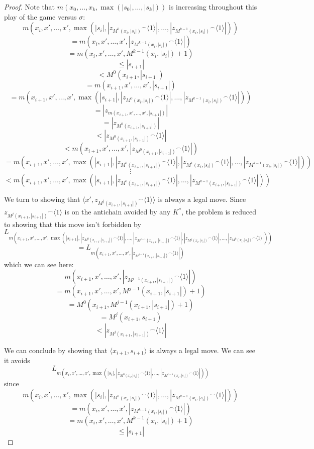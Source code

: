 \documentclass[11pt]{article}
\theoremstyle{plain}
\theoremstyle{definition}
\theoremstyle{remark}
\newcommand{\<}{\langle}
\renewcommand{\>}{\rangle}
\begin{document}
\begin{proof}
Note that $m(x_0,\dots,x_{k},\max(|s_0|,\dots,|s_k|))$ is increasing throughout this play of the game versus $\sigma$:
  \[
    m(x_i,x',\dots,x',\max(|s_i|,|{z_{M^0(x_i,|s_i|)}}^\frown\<1\>|,\dots,|{z_{M^{k-1}(x_i,|s_i|)}}^\frown\<1\>|))
  \]
  \[
    =
    m(x_i,x',\dots,x',|{z_{M^{k-1}(x_i,|s_i|)}}^\frown\<1\>|)
  \]
  \[
    =
    m(x_i,x',\dots,x',M^{k-1}(x_i,|s_i|)+1)
  \]
  \[
    \leq
    |s_{i+1}| 
  \]
  \[
    <
    M^0(x_{i+1},|s_{i+1}|)
  \]
  \[
    =
    m(x_{i+1},x',\dots,x',|s_{i+1}|)
  \]
  \[
    =
    m(x_{i+1},x',\dots,x',\max(|s_{i+1}|,|{z_{M^0(x_i,|s_i|)}}^\frown\<1\>|,\dots,|{z_{M^{k-1}(x_i,|s_i|)}}^\frown\<1\>|))
  \]
  \[
    =
    |{z_{m(x_{i+1},x',\dots,x',|s_{i+1}|)}}|
  \]
  \[
    =
    |{z_{M^0(x_{i+1},|s_{i+1}|)}}|
  \]
  \[
    <
    |{z_{M^0(x_{i+1},|s_{i+1}|)}}^\frown\<1\>|
  \]
  \[
    <
    m(x_{i+1},x',\dots,x',|{z_{M^0(x_{i+1},|s_{i+1}|)}}^\frown\<1\>|)
  \]
  \[
    =
    m(x_{i+1},x',\dots,x',\max(|s_{i+1}|,|{z_{M^0(x_{i+1},|s_{i+1}|)}}^\frown\<1\>|,|{z_{M^1(x_{i},|s_{i}|)}}^\frown\<1\>|,\dots,|{z_{M^{k-1}(x_{i},|s_{i}|)}}^\frown\<1\>|))
  \]
  \[
    \vdots
  \]
  \[
    <
    m(x_{i+1},x',\dots,x',\max(|s_{i+1}|,|{z_{M^0(x_{i+1},|s_{i+1}|)}}^\frown\<1\>|,\dots,|{z_{M^{k-1}(x_{i+1},|s_{i+1}|)}}^\frown\<1\>|))
  \]

We turn to showing that $\<x', {z_{M^j(x_{i+1},|s_{i+1}|)}}^\frown\<1\>\>$ is always a legal move. Since ${z_{M^j(x_{i+1},|s_{i+1}|)}}^\frown\<1\>$ is on the antichain avoided by any $K^*$, the problem is reduced to showing that this move isn't forbidden by
  \[
    L_{m(x_{i+1},x',\dots,x',\max(|s_{i+1}|,|{z_{M^0(x_{i+1},|s_{i+1}|)}}^\frown\<1\>|,\dots,|{z_{M^{j-1}(x_{i+1},|s_{i+1}|)}}^\frown\<1\>|,|{z_{M^{j}(x_{i},|s_{i}|)}}^\frown\<1\>|,\dots,|{z_{M^{k}(x_{i},|s_{i}|)}}^\frown\<1\>|))}
  \]
  \[
    =
    L_{m(x_{i+1},x',\dots,x',|{z_{M^{j-1}(x_{i+1},|s_{i+1}|)}}^\frown\<1\>|)}
  \]
which we can see here:
  \[
    m(x_{i+1},x',\dots,x',|{z_{M^{j-1}(x_{i+1},|s_{i+1}|)}}^\frown\<1\>|)
  \]
  \[
    =
    m(x_{i+1},x',\dots,x',M^{j-1}(x_{i+1},|s_{i+1}|)+1)
  \]
  \[
    =
    M^0(x_{i+1},M^{j-1}(x_{i+1},|s_{i+1}|)+1)
  \]
  \[
    =
    M^j(x_{i+1},s_{i+1})
  \]
  \[
    <
    |{z_{M^j(x_{i+1},|s_{i+1}|)}}^\frown\<1\>|
  \]

We can conclude by showing that $\<x_{i+1},s_{i+1}\>$ is always a legal move. We can see it avoids 
  \[
  L_{m(x_{i},x',\dots,x',\max(|s_{i}|,|{z_{M^0(x_i,|s_i|)}}^\frown\<1\>|,\dots,|{z_{M^{k-1}(x_i,|s_i|)}}^\frown\<1\>|))}
  \]
since
  \[
    m(x_{i},x',\dots,x',\max(|s_{i}|,|{z_{M^0(x_i,|s_i|)}}^\frown\<1\>|,\dots,|{z_{M^{k-1}(x_i,|s_i|)}}^\frown\<1\>|))
  \]
  \[
    =
    m(x_{i},x',\dots,x',|{z_{M^{k-1}(x_i,|s_i|)}}^\frown\<1\>|)
  \]
  \[
    =
    m(x_{i},x',\dots,x',M^{k-1}(x_i,|s_i|)+1)
  \]
  \[
    \leq
    |s_{i+1}|
  \]




\end{proof}
\end{document}
